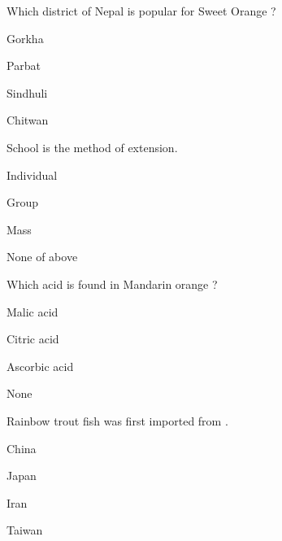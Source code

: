 \begin{questions}
\question Which district of Nepal is popular for Sweet Orange ?
\begin{items}
\item Gorkha
\item Parbat
\item* Sindhuli
\item Chitwan
\end{items}

\question School is the \fillin[][3cm] method of extension.
\begin{items}
\item Individual
\item* Group
\item Mass
\item None of above
\end{items}

\question Which acid is found in Mandarin orange ?
\begin{items}
\item Malic acid
\item* Citric acid
\item Ascorbic acid
\item None
\end{items}

\question Rainbow trout fish was first imported from \fillin[][3cm].
\begin{items}
\item China
\item* Japan
\item Iran
\item Taiwan
\end{items}

\end{questions}
